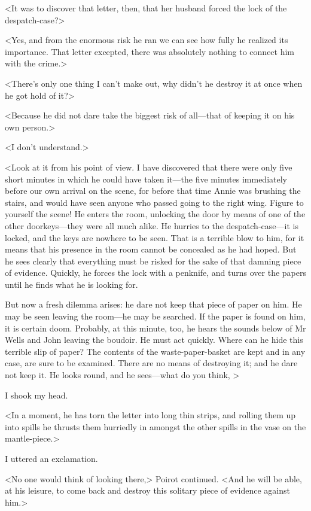  <It was to discover that letter, then, that her husband forced the lock of the despatch-case?> 

 <Yes, and from the enormous risk he ran we can see how fully he realized its importance. That letter excepted, there was absolutely nothing to connect him with the crime.> 

 <There's only one thing I can't make out, why didn't he destroy it at once when he got hold of it?> 

 <Because he did not dare take the biggest risk of all—that of keeping it on his own person.> 

 <I don't understand.> 

 <Look at it from his point of view. I have discovered that there were only five short minutes in which he could have taken it—the five minutes immediately before our own arrival on the scene, for before that time Annie was brushing the stairs, and would have seen anyone who passed going to the right wing. Figure to yourself the scene! He enters the room, unlocking the door by means of one of the other doorkeys—they were all much alike. He hurries to the despatch-case—it is locked, and the keys are nowhere to be seen. That is a terrible blow to him, for it means that his presence in the room cannot be concealed as he had hoped. But he sees clearly that everything must be risked for the sake of that damning piece of evidence. Quickly, he forces the lock with a penknife, and turns over the papers until he finds what he is looking for. 

 But now a fresh dilemma arises: he dare not keep that piece of paper on him. He may be seen leaving the room—he may be searched. If the paper is found on him, it is certain doom. Probably, at this minute, too, he hears the sounds below of Mr Wells and John leaving the boudoir. He must act quickly. Where can he hide this terrible slip of paper? The contents of the waste-paper-basket are kept and in any case, are sure to be examined. There are no means of destroying it; and he dare not keep it. He looks round, and he sees—what do you think, > 

 I shook my head. 

 <In a moment, he has torn the letter into long thin strips, and rolling them up into spills he thrusts them hurriedly in amongst the other spills in the vase on the mantle-piece.> 

 I uttered an exclamation. 

 <No one would think of looking there,> Poirot continued. <And he will be able, at his leisure, to come back and destroy this solitary piece of evidence against him.> 

